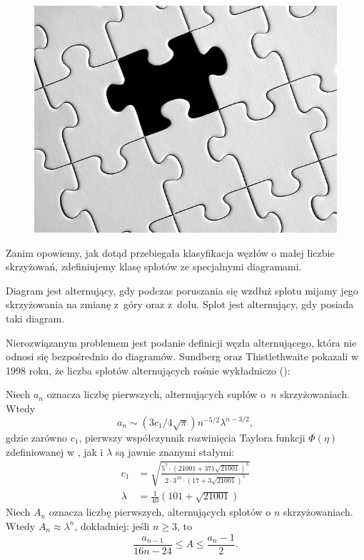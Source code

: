{\begin{figure}[H]
\begin{minipage}[b]{.32\linewidth}
        \includegraphics[width=\linewidth]{../data/missing.jpg}
    \end{minipage}
\end{figure}

Zanim opowiemy, jak dotąd przebiegała klasyfikacja węzłów o małej liczbie skrzyżowań, zdefiniujemy klasę splotów ze specjalnymi diagramami.

\begin{definition}
    Diagram jest alternujący, gdy podczas poruszania się wzdłuż splotu mijamy jego skrzyżowania na zmianę z~góry oraz z~dołu.
    Splot jest alternujący, gdy posiada taki diagram.
\end{definition}

Nierozwiązanym problemem jest podanie definicji węzła alternującego, która nie odnosi się bezpośrednio do diagramów.
Sundberg oraz Thistlethwaite pokazali w 1998 roku, że liczba splotów alternujących rośnie wykładniczo (\cite{sundberg98}):

\begin{proposition}
    Niech $a_n$ oznacza liczbę pierwszych, alternujących supłów o~$n$ skrzyżowaniach.
    Wtedy
    \begin{equation}
        a_n \sim (3c_1/4\sqrt{\pi})n^{-5/2}\lambda^{n-3/2},
    \end{equation}
    gdzie zarówno $c_1$, pierwszy współczynnik rozwinięcia Taylora funkcji $\Phi(\eta)$ zdefiniowanej w \cite{sundberg98}, jak i $\lambda$ są jawnie znanymi stałymi:
    \begin{align}
        c_1 & = \sqrt{\frac{5^7 \cdot (21001 + 371 \sqrt{21001})^3}{2 \cdot 3^{10} \cdot (17 + 3\sqrt{21001})^5}} \\
        \lambda & = \frac {1}{40} (101 + \sqrt{21001})
    \end{align}
    Niech $A_n$ oznacza liczbę pierwszych, alternujących splotów o $n$ skrzyżowaniach.
    Wtedy $A_n \approx \lambda^n$, dokładniej: jeśli $n \ge 3$, to
    \begin{equation}
        \frac{a_{n-1}}{16n - 24} \le A \le \frac{a_n - 1}{2}.
    \end{equation}
\end{proposition}

}
